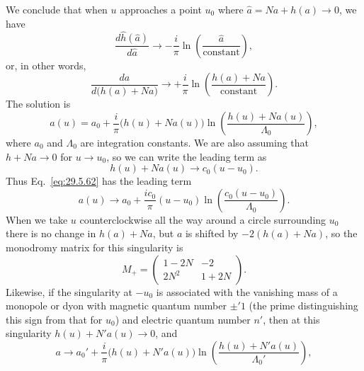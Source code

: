 We conclude that when \(u\) approaches a point \(u_0\) where
\(\widehat a=Na+h(a)\longrightarrow0\), we have
\begin{equation}
  \frac{d\widehat h(\widehat a)}{d\widehat a}
  \longrightarrow-\frac{i}{\pi}
  \ln\left(\frac{\widehat a}{\text{constant}}\right),
  \tag{29.5.60}\label{eq:29.5.60}
\end{equation}
or, in other words,
\begin{equation}
  \frac{da}{d\bigl(h(a)+Na\bigr)}
  \longrightarrow+\frac{i}{\pi}
  \ln\left(\frac{h(a)+Na}{\text{constant}}\right).
  \tag{29.5.61}\label{eq:29.5.61}
\end{equation}
The solution is
\begin{equation}
  a(u)=a_0+\frac{i}{\pi}\bigl(h(u)+Na(u)\bigr)
  \ln\left(\frac{h(u)+Na(u)}{\Lambda_0}\right),
  \tag{29.5.62}\label{eq:29.5.62}
\end{equation}
where \(a_0\) and \(\Lambda_0\) are integration constants. We are also
assuming that \(h+Na\longrightarrow0\) for \(u\longrightarrow u_0\), so we
can write the leading term as
\begin{equation}
  h(u)+Na(u)\longrightarrow c_0(u-u_0).
  \tag{29.5.63}\label{eq:29.5.63}
\end{equation}
Thus Eq.~\eqref{eq:29.5.62} has the leading term
\begin{equation}
  a(u)\longrightarrow a_0+\frac{ic_0}{\pi}(u-u_0)
  \ln\left(\frac{c_0(u-u_0)}{\Lambda_0}\right).
  \tag{29.5.64}\label{eq:29.5.64}
\end{equation}
When we take \(u\) counterclockwise all the way around a circle surrounding
\(u_0\) there is no change in \(h(a)+Na\), but \(a\) is shifted by
\(-2(h(a)+Na)\), so the monodromy matrix for this singularity is
\begin{equation}
  M_+=
  \begin{pmatrix}
    1-2N&-2\\
    2N^2&1+2N
  \end{pmatrix}.
  \tag{29.5.65}\label{eq:29.5.65}
\end{equation}
Likewise, if the singularity at \(-u_0\) is associated with the vanishing
mass of a monopole or dyon with magnetic quantum number \(\mathord{\pm}'1\)
(the prime distinguishing this sign from that for \(u_0\)) and electric
quantum number \(n'\), then at this singularity
\(h(u)+N'a(u)\longrightarrow0\), and
\begin{equation}
  a\longrightarrow a_0'
  +\frac{i}{\pi}\bigl(h(u)+N'a(u)\bigr)
  \ln\left(\frac{h(u)+N'a(u)}{\Lambda_0'}\right),
  \tag{29.5.66}\label{eq:29.5.66}
\end{equation}
